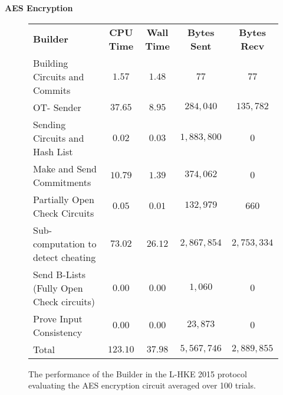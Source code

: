\documentclass[ %
                    author={Nicholas Tutte},
                supervisor={Prof. Nigel Smart},
                    degree={MEng},
                     title={Secure Two Party Computation},
                  subtitle={A practical comparison of recent protocols},
                      type={Research - GG1K},
                      year={2015} ]{dissertation}
\begin{document}
				\FloatBarrier
				\noindent \textbf{AES Encryption}
				\begin{figure}[!ht]
					\begin{tabular}{| p{4.3cm} | c c c c |}
						\hline
						\textbf{Builder} & \textbf{CPU Time} & \textbf{Wall Time} & \textbf{Bytes Sent} & \textbf{Bytes Recv} \\
						\thickhline
						Building Circuits and Commits & $1.57$ & $1.48$ & $77$ & $77$ \\
						\hline
						OT- Sender & $37.65$ & $8.95$ & $284,040$ & $135,782$ \\
						\hline
						Sending Circuits and Hash List & $0.02$ & $0.03$ & $1,883,800$ & $0$ \\
						\hline
						Make and Send Commitments & $10.79$ & $1.39$ & $374,062$ & $0$ \\
						\hline
						Partially Open Check Circuits & $0.05$ & $0.01$ & $132,979$ & $660$ \\
						\hline
						Sub-computation to detect cheating & $73.02$ & $26.12$ & $2,867,854$ & $2,753,334$ \\
						\hline
						Send B-Lists (Fully Open Check circuits) & $0.00$ & $0.00$ & $1,060$ & $0$ \\
						\hline
						Prove Input Consistency & $0.00$ & $0.00$ & $23,873$ & $0$ \\
						\thickhline
						Total & $123.10$ & $37.98$ & $5,567,746$ & $2,889,855$ \\
						\hline
					\end{tabular}
					\caption{The performance of the Builder in the L-HKE 2015 protocol evaluating the AES encryption circuit averaged over 100 trials. \label{table:L-HKE_2015_AES_Builder}}
				\end{figure}
\end{document}
